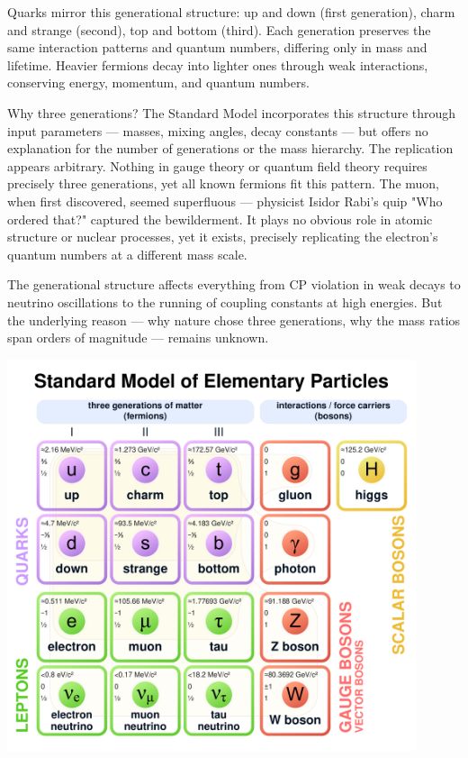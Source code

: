 Quarks mirror this generational structure: up and down (first generation), charm and strange (second), top and bottom (third). Each generation preserves the same interaction patterns and quantum numbers, differing only in mass and lifetime. Heavier fermions decay into lighter ones through weak interactions, conserving energy, momentum, and quantum numbers.

Why three generations? The Standard Model incorporates this structure through input parameters — masses, mixing angles, decay constants — but offers no explanation for the number of generations or the mass hierarchy. The replication appears arbitrary. Nothing in gauge theory or quantum field theory requires precisely three generations, yet all known fermions fit this pattern. The muon, when first discovered, seemed superfluous — physicist Isidor Rabi's quip "Who ordered that?" captured the bewilderment. It plays no obvious role in atomic structure or nuclear processes, yet it exists, precisely replicating the electron's quantum numbers at a different mass scale.

The generational structure affects everything from CP violation in weak decays to neutrino oscillations to the running of coupling constants at high energies. But the underlying reason — why nature chose three generations, why the mass ratios span orders of magnitude — remains unknown.

\begin{center}
\vspace*{2em}
\includegraphics[width=0.9\textwidth]{19_CosmicRayMuons/Standard_Model_of_Elementary_Particles.pdf}
\vspace{2em}
\end{center}
